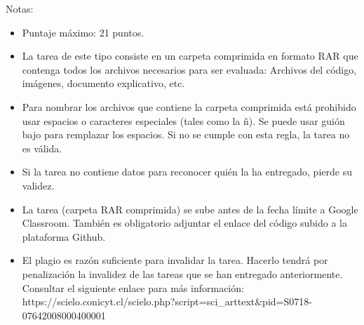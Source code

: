 \documentclass[11pt,article,landscape]{memoir}
\begin{document}
Notas:\\
\begin{itemize}
    \item Puntaje máximo: 21 puntos.
    \item La tarea de este tipo consiste en un carpeta comprimida en formato RAR que contenga todos los archivos necesarios para ser evaluada: Archivos del código, imágenes, documento explicativo, etc.
    \item Para nombrar los archivos que contiene la carpeta comprimida está prohibido usar espacios o caracteres especiales (tales como la ñ). Se puede usar guión bajo para remplazar los espacios. Si no se cumple con esta regla, la tarea no es válida.
    \item Si la tarea no contiene datos para reconocer quién la ha entregado, pierde su validez.
    \item La tarea (carpeta RAR comprimida) se sube antes de la fecha límite a Google Classroom. También es obligatorio adjuntar el enlace del código subido a la plataforma Github.
    \item El plagio es razón suficiente para invalidar la tarea. Hacerlo tendrá por penalización la invalidez de las tareas que se han entregado anteriormente. Consultar el siguiente enlace para más información: https://scielo.conicyt.cl/scielo.php?script=sci\_arttext\&pid=S0718-07642008000400001
\end{itemize}
\end{document}
